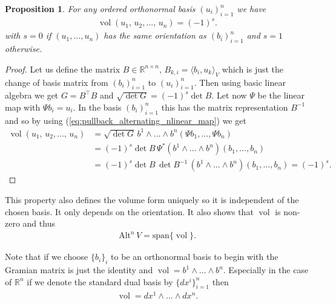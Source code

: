 \documentclass[12pt,a4paper]{article}
\numberwithin{equation}{subsection}
\numberwithin{lemma}{subsection}
\newtheorem{proposition}[lemma]{Proposition}
\theoremstyle{definition}
\DeclareMathOperator{\vol}{vol}
\newcommand{\alternating}[2]{ {\text{Alt}^{#1}\,#2} }
\newcommand{\real}{\mathbb{R}}
\begin{document}
\begin{proposition}
    For any ordered
    orthonormal basis $(u_i)_{i=1}^n$ we have 
    \begin{align*}
        \vol (u_1,\,u_2,...,\,u_n) = (-1)^s.
    \end{align*}
    with $s=0$ if $(u_1,...,u_n)$ has the same orientation as $(b_i)_{i=1}^n$ 
    and $s=1$ otherwise. 
\end{proposition}
\begin{proof}
    Let us define the matrix $B \in \real^{n\times n}$, $B_{k,i} = \langle b_i, u_k
    \rangle_V$ which is just the change of basis matrix from $( b_i )_{i=1}^n$ 
    to $( u_i )_{i=1}^n$. 
    Then using basic linear algebra we get
    $ G = B^\top B$ and 
    $\sqrt{\det G} = (-1)^s \det B$. Let now $\Psi$ be the linear map with 
    $\Psi b_i = u_i$. In the basis $( b_i )_{i=1}^n$ this has the matrix 
    representation $B^{-1}$ and so by using 
    (\ref{eq:pullback_alternating_nlinear_map}) we get
    \begin{align*}
        \vol (u_1,\,u_2,...,\,u_n) &= \sqrt{ \det G} \, b^1 \wedge ... \wedge b^n 
        ( \Psi b_1,..., \Psi b_n )
        \\ &= (-1)^s \det B \, \Psi^* (b^1 \wedge ... \wedge b^n )( b_1,..., b_n) 
        \\ &= (-1)^s \det B \, \det B^{-1} \, (b^1 \wedge ... \wedge b^n )( b_1,..., b_n)
        = (-1)^s.
    \end{align*}
\end{proof}
This property also defines the volume form uniquely so it is independent of the 
chosen basis. It only depends on the orientation.
It also shows that $\vol$ is non-zero and thus 
\begin{align*}
    \alternating{n}{V} = \text{span} \{ \vol \}.
\end{align*}

Note that if we choose $\{ b_i \}_{i}$ to be an orthonormal basis to begin 
with the Gramian matrix is just the identity and 
$\vol = b^1 \wedge ... \wedge b^n$. Especially in the case of $\real^n$ if 
we denote the standard dual basis by $\{ dx^i \}_{i=1}^n$ then 
\begin{align*}
    \vol = dx^1 \wedge ... \wedge dx^n.
\end{align*}
\end{document}
